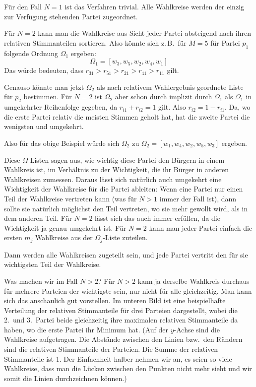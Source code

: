 Für den Fall $N = 1$ ist das Verfahren trivial. Alle Wahlkreise werden der einzig zur Verfügung
stehenden Partei zugeordnet.

Für $N = 2$ kann man die Wahlkreise aus Sicht jeder Partei absteigend nach ihren relativen
Stimmanteilen sortieren. Also könnte sich z.\,B.\ für $M = 5$ für Partei $p_1$ folgende Ordnung
$\Omega_1$ ergeben:
\[
  \Omega_1 = [w_3, w_5, w_2, w_4, w_1]
\]
Das würde bedeuten, dass $r_{31} > r_{51} > r_{21} > r_{41} > r_{11}$ gilt.

Genauso könnte man jetzt $\Omega_2$ als nach relativem Wahlergebnis geordnete Liste für $p_2$
bestimmen. Für $N = 2$ ist $\Omega_2$ aber schon durch implizit durch $\Omega_1$ als $\Omega_1$ in
umgekehrter Reihenfolge gegeben, da $r_{i1} + r_{i2} = 1$ gilt. Also $r_{i2} = 1 - r_{i1}$. Da,
wo die erste Partei relativ die meisten Stimmen geholt hat, hat die zweite Partei die wenigsten
und umgekehrt.

Also für das obige Beispiel würde sich $\Omega_2$ zu $\Omega_2 = [w_1, w_4, w_2, w_5, w_3]$
ergeben.

Diese $\Omega$-Listen sagen aus, wie wichtig diese Partei den Bürgern in einem Wahlkreis ist, im
Verhältnis zu der Wichtigkeit, die ihr Bürger in anderen Wahlkreisen zumessen. Daraus lässt sich
natürlich auch umgekehrt eine Wichtigkeit der Wahlkreise für die Partei ableiten: Wenn eine Partei
nur einen Teil der Wahlkreise vertreten kann (was für $N > 1$ immer der Fall ist), dann sollte sie
natürlich möglichst den Teil vertreten, wo sie mehr gewollt wird, als in dem anderen Teil. Für
$N = 2$ lässt sich das auch immer erfüllen, da die Wichtigkeit ja genau umgekehrt ist. Für
$N = 2$ kann man jeder Partei einfach die ersten $m_j$ Wahlkreise aus der $\Omega_j$-Liste
zuteilen.

Dann werden alle Wahlkreisen zugeteilt sein, und jede Partei vertritt den für sie wichtigsten
Teil der Wahlkreise.

Was machen wir im Fall $N > 2$? Für $N > 2$ kann ja derselbe Wahlkreis durchaus für mehrere
Parteien der wichtigste sein, nur nicht für alle gleichzeitig. Man kann sich das anschaulich gut
vorstellen. Im unteren Bild ist eine beispielhafte Verteilung der relativen Stimmanteile für drei
Parteien dargestellt, wobei die 2.\ und 3.\ Partei beide gleichzeitig ihre maximalen relativen
Stimmanteile da haben, wo die erste Partei ihr Minimum hat. (Auf der $y$-Achse sind die Wahlkreise
aufgetragen. Die Abstände zwischen den Linien bzw.\ den Rändern sind die relativen Stimmanteile
der Parteien. Die Summe der relativen Stimmanteile ist 1. Der Einfachheit halber nehmen wir an,
es seien so viele Wahlkreise, dass man die Lücken zwischen den Punkten nicht mehr sieht und wir
somit die Linien durchzeichnen können.)

